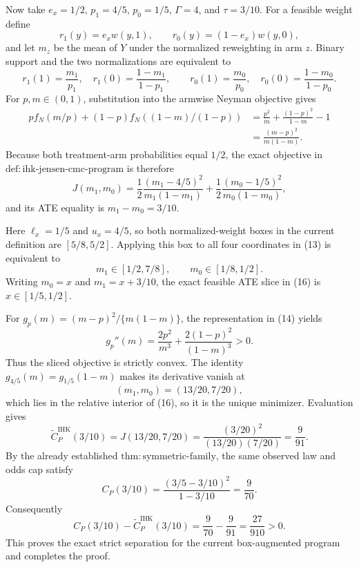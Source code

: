 Now take \(e_x=1/2\), \(p_1=4/5\), \(p_0=1/5\), \(\Gamma=4\), and \(\tau=3/10\).  For a feasible weight define
\[
r_1(y)=e_xw(y,1),\qquad r_0(y)=(1-e_x)w(y,0),
\]
and let \(m_z\) be the mean of \(Y\) under the normalized reweighting in arm \(z\).  Binary support and the two normalizations are equivalent to
\[
r_1(1)=\frac{m_1}{p_1},\quad
r_1(0)=\frac{1-m_1}{1-p_1},\qquad
r_0(1)=\frac{m_0}{p_0},\quad
r_0(0)=\frac{1-m_0}{1-p_0}.
\tag{13}
\]
For \(p,m\in(0,1)\), substitution into the armwise Neyman objective gives
\[
\begin{aligned}
pf_N(m/p)+(1-p)f_N((1-m)/(1-p))
&=\frac{p^2}{m}+\frac{(1-p)^2}{1-m}-1\\
&=\frac{(m-p)^2}{m(1-m)}.
\end{aligned}
\tag{14}
\]
Because both treatment-arm probabilities equal \(1/2\), the exact objective in \(\mathrm{def{:}ihk\mbox{-}jensen\mbox{-}cmc\mbox{-}program}\) is therefore
\[
J(m_1,m_0)
=\frac12\frac{(m_1-4/5)^2}{m_1(1-m_1)}
+\frac12\frac{(m_0-1/5)^2}{m_0(1-m_0)},
\tag{15}
\]
and its ATE equality is \(m_1-m_0=3/10\).

Here \(\ell_x=1/5\) and \(u_x=4/5\), so both normalized-weight boxes in the current definition are \([5/8,5/2]\).  Applying this box to all four coordinates in (13) is equivalent to
\[
m_1\in[1/2,7/8],\qquad m_0\in[1/8,1/2].
\tag{16}
\]
Writing \(m_0=x\) and \(m_1=x+3/10\), the exact feasible ATE slice in (16) is \(x\in[1/5,1/2]\).

For \(g_p(m)=(m-p)^2/\{m(1-m)\}\), the representation in (14) yields
\[
g_p''(m)=\frac{2p^2}{m^3}+\frac{2(1-p)^2}{(1-m)^3}>0.
\tag{17}
\]
Thus the sliced objective is strictly convex.  The identity \(g_{4/5}(m)=g_{1/5}(1-m)\) makes its derivative vanish at
\[
(m_1,m_0)=(13/20,7/20),
\tag{18}
\]
which lies in the relative interior of (16), so it is the unique minimizer.  Evaluation gives
\[
\widetilde C^{\mathrm{IHK}}_P(3/10)
=J(13/20,7/20)
=\frac{(3/20)^2}{(13/20)(7/20)}
=\frac9{91}.
\tag{19}
\]
By the already established \(\mathrm{thm{:}symmetric\mbox{-}family}\), the same observed law and odds cap satisfy
\[
C_P(3/10)
=\frac{(3/5-3/10)^2}{1-3/10}
=\frac9{70}.
\tag{20}
\]
Consequently
\[
C_P(3/10)-\widetilde C^{\mathrm{IHK}}_P(3/10)
=\frac9{70}-\frac9{91}
=\frac{27}{910}>0.
\tag{21}
\]
This proves the exact strict separation for the current box-augmented program and completes the proof.

